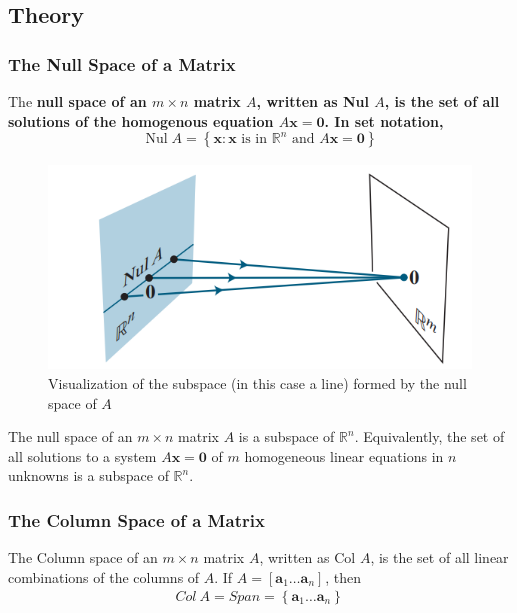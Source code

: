   \subsection*{Theory}
    \subsubsection*{The Null Space of a Matrix}

    

    \begin{mydef}\label{def: null space}
      The \bf{null space} of an $ m × n $ matrix $ A $, written as Nul $ A $, is the set of all solutions of the homogenous equation $ A \mathbf x = \mathbf 0 $. In set notation, 
      \[
      \operatorname{Nul} A = \left\{\mathbf x: \mathbf x \text{ is in } \mathbb R^{n}  \text{ and } A \mathbf x = \mathbf 0 \right\}_{}^{}
      \]
      
      
      
    \end{mydef}    

    \begin{figure}[h!]
      \centering
      \includegraphics[scale = .7]{Bilder/nullspace_figure.png}
      \caption{Visualization of the subspace (in this case a line) formed by the null space of $ A $}
      \label{fig:figure1}
    \end{figure}

    \begin{theorem} \label{theorem: null space}
      The null space of an $ m × n  $ matrix $ A $ is a subspace of $ \mathbb R^{n} $. Equivalently, the set of all solutions to a system $ A \mathbf  x = \mathbf  0 $ of $ m  $ homogeneous linear equations in $ n $ unknowns is a subspace of $ \mathbb R^{n} $. 
    \end{theorem}

    \subsubsection*{The Column Space of a Matrix}
      \begin{mydef}\label{def: column space}
        The Column space of an $ m × n $ matrix $ A $, written as Col $ A $, is the set of all linear combinations of the columns of $ A $. If $ A = \left[\mathbf a_1 \dots \mathbf a_n\right]_{}^{} $, then 
        \[
        Col \ A = Span = \left\{\mathbf a_1 \dots \mathbf a_n\right\}_{}^{} 
        \]
      \end{mydef}

